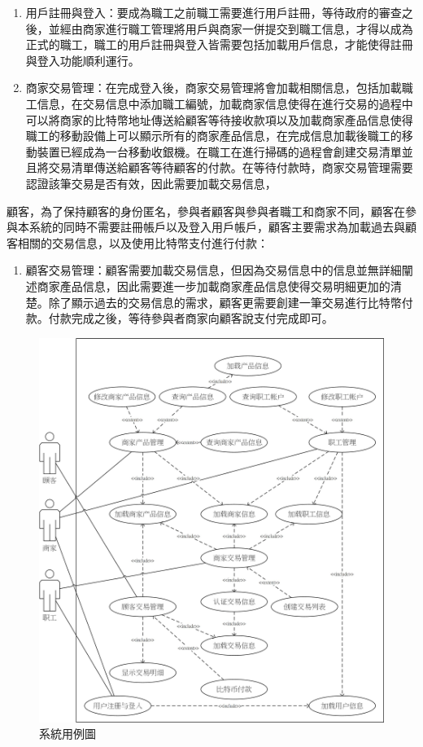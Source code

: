 	\begin{enumerate}
	\item 用戶註冊與登入：要成為職工之前職工需要進行用戶註冊，等待政府的審查之後，並經由商家進行職工管理將用戶與商家一併提交到職工信息，才得以成為正式的職工，職工的用戶註冊與登入皆需要包括加載用戶信息，才能使得註冊與登入功能順利運行。
	\item 商家交易管理：在完成登入後，商家交易管理將會加載相關信息，包括加載職工信息，在交易信息中添加職工編號，加載商家信息使得在進行交易的過程中可以將商家的比特幣地址傳送給顧客等待接收款項以及加載商家產品信息使得職工的移動設備上可以顯示所有的商家產品信息，在完成信息加載後職工的移動裝置已經成為一台移動收銀機。在職工在進行掃碼的過程會創建交易清單並且將交易清單傳送給顧客等待顧客的付款。在等待付款時，商家交易管理需要認證該筆交易是否有效，因此需要加載交易信息，
	\end{enumerate}

顧客，為了保持顧客的身份匿名，參與者顧客與參與者職工和商家不同，顧客在參與本系統的同時不需要註冊帳戶以及登入用戶帳戶，顧客主要需求為加載過去與顧客相關的交易信息，以及使用比特幣支付進行付款：
	\begin{enumerate}
	\item 顧客交易管理：顧客需要加載交易信息，但因為交易信息中的信息並無詳細闡述商家產品信息，因此需要進一步加載商家產品信息使得交易明細更加的清楚。除了顯示過去的交易信息的需求，顧客更需要創建一筆交易進行比特幣付款。付款完成之後，等待參與者商家向顧客說支付完成即可。
	\end{enumerate}

	\begin{figure}[!htbp]
	\centering
	\includegraphics[width = 1\textwidth]{UC.jpg}
	\caption{系統用例圖}\label{UC}
	\end{figure}

